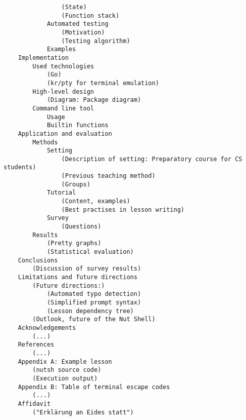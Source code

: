 \documentclass{scrreprt}
\begin{document}
\begin{verbatim}
                (State)
                (Function stack)
            Automated testing
                (Motivation)
                (Testing algorithm)
            Examples
    Implementation
        Used technologies
            (Go)
            (kr/pty for terminal emulation)
        High-level design
            (Diagram: Package diagram)
        Command line tool
            Usage
            Builtin functions
    Application and evaluation
        Methods
            Setting
                (Description of setting: Preparatory course for CS students)
                (Previous teaching method)
                (Groups)
            Tutorial
                (Content, examples)
                (Best practises in lesson writing)
            Survey
                (Questions)
        Results
            (Pretty graphs)
            (Statistical evaluation)
    Conclusions
        (Discussion of survey results)
    Limitations and future directions
        (Future directions:)
            (Automated typo detection)
            (Simplified prompt syntax)
            (Lesson dependency tree)
        (Outlook, future of the Nut Shell)
    Acknowledgements
        (...)
    References
        (...)
    Appendix A: Example lesson
        (nutsh source code)
        (Execution output)
    Appendix B: Table of terminal escape codes
        (...)
    Affidavit
        ("Erklärung an Eides statt")
\end{verbatim}
\end{document}

